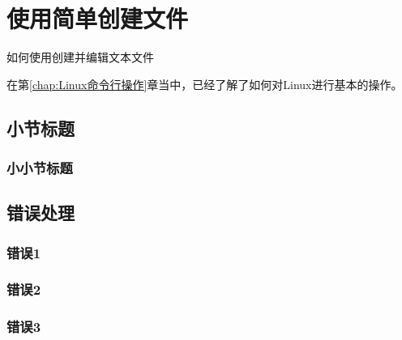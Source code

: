 \section{使用简单创建文件}\label{sec:使用nano简单创建文件}

\begin{Abstract}
    \item 如何使用创建并编辑文本文件
\end{Abstract}


在第\ref{chap:Linux命令行操作}章当中，已经了解了如何对Linux进行基本的操作。

\subsection{小节标题}\label{subsec:节标题-小节标题}

\subsubsection{小小节标题}



\subsection{错误处理}\label{subsec:节标题-错误处理}

\subsubsection{错误1}

\subsubsection{错误2}

\subsubsection{错误3}